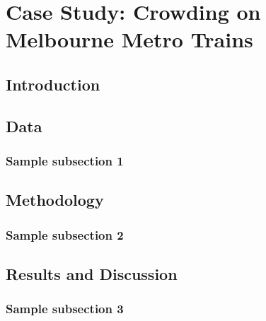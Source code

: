 \chapter{Case Study: Crowding on Melbourne Metro Trains}
\label{chap:CaseStudy}

\section{Introduction}

\section{Data}
\subsection{Sample subsection 1}

\section{Methodology}
\subsection{Sample subsection 2}

\section{Results and Discussion}
\subsection{Sample subsection 3}
